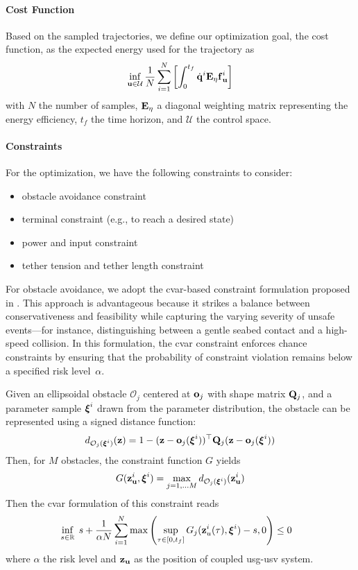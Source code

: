 \documentclass[a4paper,11pt]{article}
\newcommand{\Mat}[1]{\mathbf{\MakeUppercase{#1}}}
\renewcommand{\vec}[1]{\boldsymbol{\mathbf{\MakeLowercase{#1}}}}
\begin{document}
\paragraph{Cost Function}
Based on the sampled trajectories, we define our optimization goal, the cost function, as the expected energy used for the trajectory as
\begin{equation}
\inf_{\vec{u} \in \mathcal{U}} \frac 1 N \sum_{i=1}^{N} \left[ \int_0^{t_f} \dot{\vec{q}}^i \Mat{E}_\eta \vec{f}_{\vec{u}}^i \right]
\end{equation}
with $N$ the number of samples, $\Mat{E}_\eta$ a diagonal weighting matrix representing the energy efficiency, $t_f$ the time horizon, and $\mathcal{U}$ the control space.

\paragraph{Constraints}
For the optimization, we have the following constraints to consider:
\begin{itemize}
	\item obstacle avoidance constraint
	\item terminal constraint (e.g., to reach a desired state)
	\item power and input constraint
	\item tether tension and tether length constraint
\end{itemize}
For obstacle avoidance, we adopt the \gls{cvar}-based constraint formulation proposed in \cite{lew2023risk}. This approach is advantageous because it strikes a balance between conservativeness and feasibility while capturing the varying severity of unsafe events—for instance, distinguishing between a gentle seabed contact and a high-speed collision. In this formulation, the \gls{cvar} constraint enforces chance constraints by ensuring that the probability of constraint violation remains below a specified risk level~$\alpha$. 

Given an ellipsoidal obstacle $\mathcal{O}_j$ centered at $\vec{o}_j$ with shape matrix $\Mat{Q}_j$, and a parameter sample $\vec{\xi}^i$ drawn from the parameter distribution, the obstacle can be represented using a signed distance function:
$$
d_{\mathcal{O}_j(\vec{\xi}^i)}(\vec{z})=1 - (\vec{z}- \vec{o}_j(\vec{\xi}^i))^\top \Mat{Q}_j(\vec{z}- \vec{o}_j(\vec{\xi}^i))
$$
Then, for $M$ obstacles, the constraint function $G$ yields
\begin{align}
    G(\vec{z}_{\vec{u}}^i, \vec{\xi}^i) = \max_{j=1,\ldots M} d_{\mathcal{O}_j(\vec{\xi}^i)}(\vec{z}_{\vec{u}}^i)
\end{align}
Then the \gls{cvar} formulation of this constraint \cite{lew2023risk} reads 
\begin{align}
	&\inf_{s \in \mathbb{R}} \;  s + \frac{1}{\alpha N} \sum_{i=1}^{N} \max \left( \sup_{\tau \in [0, t_f]} {G}_j({\vec{z}}^i_u(\tau), \vec{\xi}^i) - s, 0 \right) \leq 0
\end{align}
where $\alpha$ the risk level and $\vec{z}_{\vec{u}}$ as the position of coupled \gls{usg}-\gls{usv} system.
\end{document}
